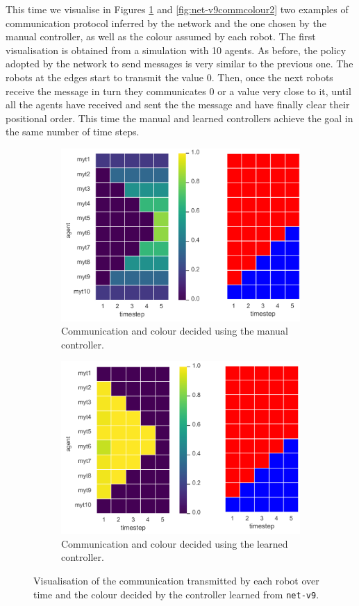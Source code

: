 This time we visualise in Figures \ref{fig:net-v9commcolour} and 
\ref{fig:net-v9commcolour2} two examples of communication protocol inferred 
by the network and the one chosen by the manual controller, as well as the colour 
assumed by each robot.
The first visualisation is obtained from a simulation with 10 agents. 
As before, the policy adopted by the network to send messages is very similar to 
the previous one. The robots at the edges start to transmit the value 0. Then, once 
the next robots receive the message in turn they communicates 0 or a value very 
close to it, until all the agents have received and sent the the message and have 
finally clear their positional order.
This time the manual and learned controllers achieve the goal in the same 
number of time steps.
\begin{figure}[!htb]
	\begin{subfigure}[h]{\textwidth}
		\centering
		\includegraphics[width=.6\textwidth]{contents/images/net-v9/manual-0}
		\caption{Communication and colour decided using the manual controller.}
	\end{subfigure}
	\hspace*{\fill}%
	\vspace*{8pt}%
	\hspace*{\fill}%
	\begin{subfigure}[h]{\textwidth}
		\centering			
		\includegraphics[width=.6\textwidth]{contents/images/net-v9/learned-0}
		\caption{Communication and colour decided using the learned controller.}
	\end{subfigure}
	\caption[Evaluation of the communication learned by 
	\texttt{net-v9}.]{Visualisation of the communication transmitted by each 
		robot over time and the colour decided by the controller learned from 
		\texttt{net-v9}.}	
	\label{fig:net-v9commcolour}
\end{figure}

